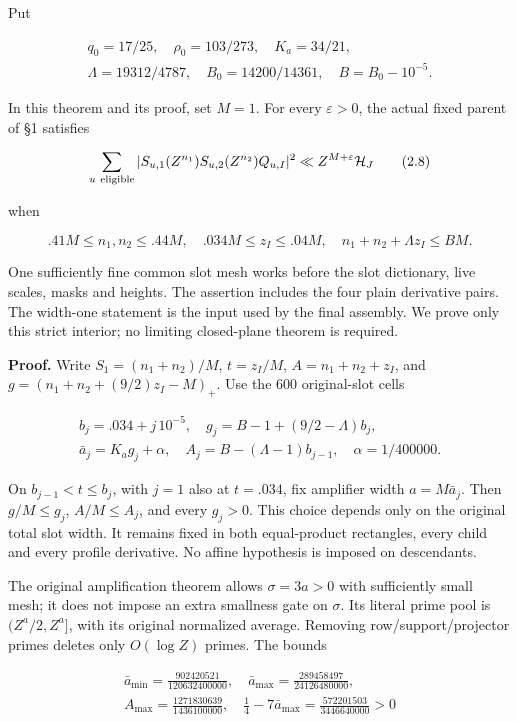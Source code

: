 \documentclass[11pt,a4paper]{article}
\begin{document}
Put

\[
\begin{gathered}
q_0=17/25,\quad \rho_0=103/273,\quad K_a=34/21,\\
\Lambda=19312/4787,\quad B_0=14200/14361,\quad B=B_0-10^{-5}.
\end{gathered}
\tag{2.7}
\]

In this theorem and its proof, set \(M=1\). For every \(\varepsilon>0\),
the actual fixed parent of §1 satisfies

\[
\sum_{u\ {\rm eligible}}
 |S_{u,1}(Z^{n_1})S_{u,2}(Z^{n_2})Q_{u,I}|^2
 \ll Z^{M+\varepsilon}\mathcal H_J
\tag{2.8}
\]

when

\[
.41M\le n_1,n_2\le.44M,\quad .034M\le z_I\le.04M,
\quad n_1+n_2+\Lambda z_I\le BM.
\tag{2.9}
\]

One sufficiently fine common slot mesh works before the slot dictionary,
live scales, masks and heights. The assertion includes the four plain
derivative pairs. The width-one statement is the input used by the final
assembly. We prove only this strict interior; no limiting closed-plane
theorem is required.

\textbf{Proof.} Write \(S_1=(n_1+n_2)/M\), \(t=z_I/M\),
\(A=n_1+n_2+z_I\), and \(g=(n_1+n_2+(9/2)z_I-M)_+\). Use the 600
original-slot cells

\[
\begin{gathered}
b_j=.034+j\,10^{-5},\quad g_j=B-1+(9/2-\Lambda)b_j,\\
\bar a_j=K_a g_j+\alpha,\quad A_j=B-(\Lambda-1)b_{j-1},\quad \alpha=1/400000.
\end{gathered}
\tag{2.10}
\]

On \(b_{j-1}<t\le b_j\), with \(j=1\) also at \(t=.034\), fix amplifier
width \(a=M\bar a_j\). Then \(g/M\le g_j\), \(A/M\le A_j\), and every
\(g_j>0\). This choice depends only on the original total slot width. It
remains fixed in both equal-product rectangles, every child and every
profile derivative. No affine hypothesis is imposed on descendants.

The original amplification theorem allows \(\sigma=3a>0\) with
sufficiently small mesh; it does not impose an extra smallness gate on
\(\sigma\). Its literal prime pool is \((Z^a/2,Z^a]\), with its original
normalized average. Removing row/support/projector primes deletes only
\(O(\log Z)\) primes. The bounds

\[
\begin{gathered}
\bar a_{\min}=\frac{902420521}{120632400000},\quad
\bar a_{\max}=\frac{289458497}{24126480000},\\
A_{\max}=\frac{1271830639}{1436100000},\quad
\frac14-7\bar a_{\max}=\frac{572201503}{3446640000}>0
\end{gathered}
\tag{2.11}
\]
\end{document}
